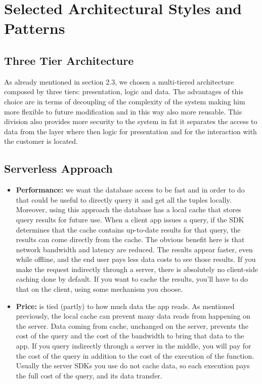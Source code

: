\documentclass[../RASD.tex]{subfiles}
\begin{document}
    \section{Selected Architectural Styles and Patterns}\label{sec:selected-architectural-styles-and-patterns}
    \subsection{Three Tier Architecture}\label{subsec:three-tier-architecture}
    As already mentioned in section 2.3, we chosen a multi-tiered architecture composed by three tiers: presentation, logic and data.
    The advantages of this choice are in terms of decoupling of the complexity of the system making him more flexible to future modification
    and in this way also more reusable.
    This division also provides more security to the system in fat it separates the access to data from the layer where then logic for presentation
    and for the interaction with the customer is located.
    \subsection{Serverless Approach}\label{subsec:serverless-approach}
    \begin{itemize}
        \item \textbf{Performance:} we want the database access to be fast and in order to do that could be useful to directly query it and get all the tuples locally.
        Moreover, using this approach the database has a local cache that stores query results for future use.
        When a client app issues a query, if the SDK determines that the cache contains up-to-date results for that query, the results can come directly from the cache.
        The obvious benefit here is that network bandwidth and latency are reduced.
        The results appear faster, even while offline, and the end user pays less data costs to see those results.
        If you make the request indirectly through a server, there is absolutely no client-side caching done by default.
        If you want to cache the results, you’ll have to do that on the client, using some mechanism you choose.
        \item \textbf{Price:} is tied (partly) to how much data the app reads.
        As mentioned previously, the local cache can prevent many data reads from happening on the server.
        Data coming from cache, unchanged on the server, prevents the cost of the query and the cost of the bandwidth to bring that data to the app.
        If you query indirectly through a server in the middle, you will pay for the cost of the query in addition to the cost of the execution of the function.
        Usually the server SDKs you use do not cache data, so each execution pays the full cost of the query, and its data transfer.
    \end{itemize}
\end{document}
